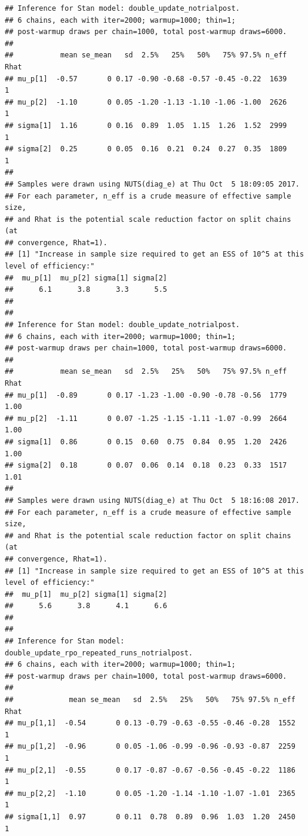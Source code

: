 \documentclass[]{article}
\begin{document}
\begin{verbatim}
## Inference for Stan model: double_update_notrialpost.
## 6 chains, each with iter=2000; warmup=1000; thin=1; 
## post-warmup draws per chain=1000, total post-warmup draws=6000.
## 
##           mean se_mean   sd  2.5%   25%   50%   75% 97.5% n_eff Rhat
## mu_p[1]  -0.57       0 0.17 -0.90 -0.68 -0.57 -0.45 -0.22  1639    1
## mu_p[2]  -1.10       0 0.05 -1.20 -1.13 -1.10 -1.06 -1.00  2626    1
## sigma[1]  1.16       0 0.16  0.89  1.05  1.15  1.26  1.52  2999    1
## sigma[2]  0.25       0 0.05  0.16  0.21  0.24  0.27  0.35  1809    1
## 
## Samples were drawn using NUTS(diag_e) at Thu Oct  5 18:09:05 2017.
## For each parameter, n_eff is a crude measure of effective sample size,
## and Rhat is the potential scale reduction factor on split chains (at 
## convergence, Rhat=1).
## [1] "Increase in sample size required to get an ESS of 10^5 at this level of efficiency:"
##  mu_p[1]  mu_p[2] sigma[1] sigma[2] 
##      6.1      3.8      3.3      5.5 
## 
## 
## Inference for Stan model: double_update_notrialpost.
## 6 chains, each with iter=2000; warmup=1000; thin=1; 
## post-warmup draws per chain=1000, total post-warmup draws=6000.
## 
##           mean se_mean   sd  2.5%   25%   50%   75% 97.5% n_eff Rhat
## mu_p[1]  -0.89       0 0.17 -1.23 -1.00 -0.90 -0.78 -0.56  1779 1.00
## mu_p[2]  -1.11       0 0.07 -1.25 -1.15 -1.11 -1.07 -0.99  2664 1.00
## sigma[1]  0.86       0 0.15  0.60  0.75  0.84  0.95  1.20  2426 1.00
## sigma[2]  0.18       0 0.07  0.06  0.14  0.18  0.23  0.33  1517 1.01
## 
## Samples were drawn using NUTS(diag_e) at Thu Oct  5 18:16:08 2017.
## For each parameter, n_eff is a crude measure of effective sample size,
## and Rhat is the potential scale reduction factor on split chains (at 
## convergence, Rhat=1).
## [1] "Increase in sample size required to get an ESS of 10^5 at this level of efficiency:"
##  mu_p[1]  mu_p[2] sigma[1] sigma[2] 
##      5.6      3.8      4.1      6.6 
## 
## 
## Inference for Stan model: double_update_rpo_repeated_runs_notrialpost.
## 6 chains, each with iter=2000; warmup=1000; thin=1; 
## post-warmup draws per chain=1000, total post-warmup draws=6000.
## 
##             mean se_mean   sd  2.5%   25%   50%   75% 97.5% n_eff Rhat
## mu_p[1,1]  -0.54       0 0.13 -0.79 -0.63 -0.55 -0.46 -0.28  1552    1
## mu_p[1,2]  -0.96       0 0.05 -1.06 -0.99 -0.96 -0.93 -0.87  2259    1
## mu_p[2,1]  -0.55       0 0.17 -0.87 -0.67 -0.56 -0.45 -0.22  1186    1
## mu_p[2,2]  -1.10       0 0.05 -1.20 -1.14 -1.10 -1.07 -1.01  2365    1
## sigma[1,1]  0.97       0 0.11  0.78  0.89  0.96  1.03  1.20  2450    1

\end{verbatim}
\end{document}
